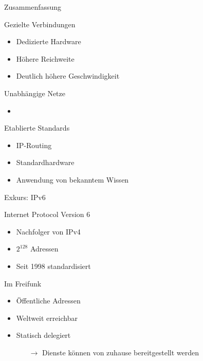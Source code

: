 \documentclass{beamer}
\begin{document}
	\begin{frame}{Zusammenfassung}
		\begin{block}{Gezielte Verbindungen}
		\begin{itemize}
			\item Dedizierte Hardware
			\item Höhere Reichweite
			\item Deutlich höhere Geschwindigkeit
		\end{itemize}
		\end{block}
		\begin{block}{Unabhängige Netze}
		\begin{itemize}
			\item
		\end{itemize}
		\end{block}
		\begin{block}{Etablierte Standards}
		\begin{itemize}
			\item IP-Routing
			\item Standardhardware
			\item Anwendung von bekanntem Wissen
		\end{itemize}
		\end{block}
	\end{frame}

	\begin{frame}{Exkurs: IPv6}
		\begin{block}{Internet Protocol Version 6}
		\begin{itemize}
			\item Nachfolger von IPv4
			\item $2^{128}$ Adressen
			\item Seit 1998 standardisiert
		\end{itemize}
		\end{block}
		\pause
		\begin{block}{Im Freifunk}
		\begin{itemize}
			\item Öffentliche Adressen
			\item Weltweit erreichbar
			\item Statisch delegiert
			\begin{itemize}
			 \item[$\rightarrow$] Dienste können von zuhause bereitgestellt werden
			\end{itemize}
		\end{itemize}
		\end{block}
	\end{frame}
\end{document}
